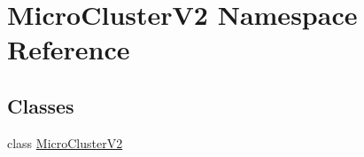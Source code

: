 \hypertarget{namespaceMicroClusterV2}{}\section{Micro\+Cluster\+V2 Namespace Reference}
\label{namespaceMicroClusterV2}
\subsection*{Classes}
\begin{DoxyCompactItemize}
\item 
class \hyperlink{classMicroClusterV2_1_1MicroClusterV2}{Micro\+Cluster\+V2}
\end{DoxyCompactItemize}
